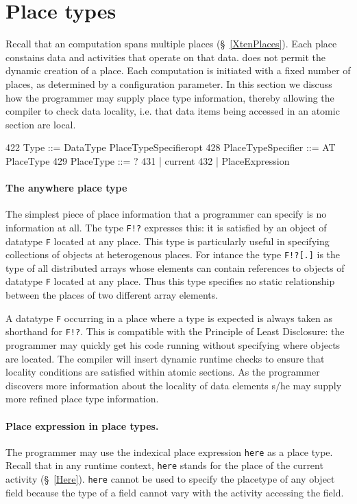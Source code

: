 \section{Place types}\label{PlaceTypes}
Recall that an \Xten{} computation spans multiple places
(\S~\ref{XtenPlaces}). Each place constains data and activities that
operate on that data.  \XtenCurrVer{} does not permit the dynamic
creation of a place. Each \Xten{} computation is initiated with a
fixed number of places, as determined by a configuration parameter.
In this section we discuss how the programmer may supply place type
information, thereby allowing the compiler to check data locality,
i.e.{} that data items being accessed in an atomic section are local.

\begin{x10}
422   Type ::= DataType PlaceTypeSpecifieropt
428   PlaceTypeSpecifier ::= AT PlaceType
429   PlaceType ::= ?
431     | current
432     | PlaceExpression
\end{x10}

\paragraph{The anywhere place type}\label{anywhere}
The simplest piece of place information that a programmer can specify
is no information at all. The type {\tt F!?} expresses this: it is
satisfied by an object of datatype {\tt F} located at any place.  This
type is particularly useful in specifying collections of objects at
heterogenous places. For intance the type {\tt F!?[.]} is the type of
all distributed arrays whose elements can contain references to
objects of datatype {\tt F} located at any place. Thus this type specifies
no static relationship between the places of two different array elements.

A datatype {\tt F} occurring in a place where a type is expected is
always taken as shorthand for {\tt F!?}. This is compatible with the
Principle of Least Disclosure: the programmer may quickly get his code
running without specifying where objects are located. The compiler
will insert dynamic runtime checks to ensure that locality conditions
are satisfied within atomic sections. As the programmer discovers more
information about the locality of data elements s/he may supply more
refined place type information.

\paragraph{Place expression in place types.}
The programmer may use the indexical place expression {\tt here} as a
place type. Recall that in any runtime context, {\tt here} stands for
the place of the current activity (\S~\ref{Here}). {\tt here} cannot
be used to specify the placetype of any object field because the
type of a field cannot vary with the activity accessing the field.

